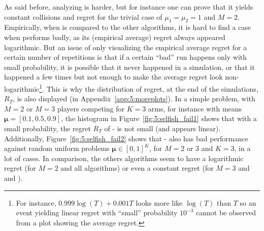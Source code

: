 %
%
%
%

As said before, analyzing \Selfish{} is harder,
but for instance one can prove that it yields constant
collisions and regret for the trivial case of $\mu_1=\mu_2=1$ and $M=2$.
%
Empirically, when \Selfish{} is compared to the other algorithms,
it is hard to find a case when \Selfish{} performs badly, as its (empirical average) regret always appeared logarithmic.
%
But an issue of only visualizing the empirical average regret for a certain number of repetitions is
that if a certain ``bad'' run happens only with small probability, it is possible that it never happened
in a simulation, or that it happened a few times but not enough to make the average regret look non-logarithmic\footnote{For instance, $0.999 \log(T) + 0.001 T$ looks more like $\log(T)$ than $T$ so an event yielding linear regret with ``small'' probability $10^{-3}$ cannot be observed from a plot showing the average regret.}.
%
This is why the distribution of regret, at the end of the simulations, $R_T$, is also displayed (in Appendix~\ref{app:5:moreplots}).
%
In a simple problem, with $M=2$ or $M=3$ players competing for $K=3$ arms,
for instance with means $\boldsymbol{\mu} = [0.1, 0.5, 0.9]$,
the histogram in Figure~\ref{fig:5:selfish_fail1} shows that with a small probability, the regret $R_T$ of \Selfish-\klUCB{} is not small (and appears linear).
%
%
Additionally, Figure~\ref{fig:5:selfish_fail2} shows that \Selfish-\klUCB{} also has bad performance against random uniform problems $\boldsymbol{\mu}\in[0,1]^K$,
for $M=2$ or $3$ and $K=3$, in a lot of cases.
In comparison, the others algorithms seem to have a logarithmic regret (for $M=2$ and all algorithms)
or even a constant regret (for $M=3$ and \RandTopM{} and \MCTopM).



